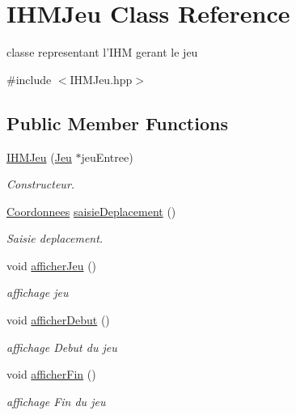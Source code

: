 \hypertarget{classIHMJeu}{\section{I\-H\-M\-Jeu Class Reference}
\label{classIHMJeu}
}


classe representant l'I\-H\-M gerant le jeu  




{\ttfamily \#include $<$I\-H\-M\-Jeu.\-hpp$>$}

\subsection*{Public Member Functions}
\begin{DoxyCompactItemize}
\item 
\hyperlink{classIHMJeu_aeec9ee5bec8bc1759d33a19f60063344}{I\-H\-M\-Jeu} (\hyperlink{classJeu}{Jeu} $\ast$jeu\-Entree)
\begin{DoxyCompactList}\small\item\em Constructeur. \end{DoxyCompactList}\item 
\hyperlink{classCoordonnees}{Coordonnees} \hyperlink{classIHMJeu_a88836d0965f93f97eba5fb55d9a5dbf9}{saisie\-Deplacement} ()
\begin{DoxyCompactList}\small\item\em Saisie deplacement. \end{DoxyCompactList}\item 
void \hyperlink{classIHMJeu_a969a1d8b259b3ae30dfea69fbf17b323}{afficher\-Jeu} ()
\begin{DoxyCompactList}\small\item\em affichage jeu \end{DoxyCompactList}\item 
void \hyperlink{classIHMJeu_a3ee9a60e39a2030f52cf70c4fce65917}{afficher\-Debut} ()
\begin{DoxyCompactList}\small\item\em affichage Debut du jeu \end{DoxyCompactList}\item 
void \hyperlink{classIHMJeu_aae795dbead0491158e0475b80f572e36}{afficher\-Fin} ()
\begin{DoxyCompactList}\small\item\em affichage Fin du jeu \end{DoxyCompactList}\end{DoxyCompactItemize}


